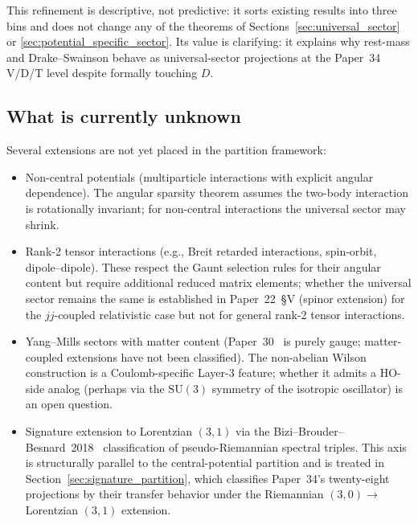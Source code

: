 \documentclass[twocolumn,pra,amsmath,amssymb,superscriptaddress]{revtex4-2}
\begin{document}
This refinement is descriptive, not predictive: it sorts existing
results into three bins and does not change any of the theorems of
Sections~\ref{sec:universal_sector} or
\ref{sec:potential_specific_sector}.  Its value is clarifying:
it explains why rest-mass and Drake--Swainson behave as
universal-sector projections at the Paper~34 V/D/T level despite
formally touching $D$.

\subsection{What is currently unknown}

Several extensions are not yet placed in the partition framework:

\begin{itemize}
\item Non-central potentials (multiparticle interactions with
  explicit angular dependence).  The angular sparsity theorem
  assumes the two-body interaction is rotationally invariant; for
  non-central interactions the universal sector may shrink.
\item Rank-2 tensor interactions (e.g., Breit retarded interactions,
  spin-orbit, dipole--dipole).  These respect the Gaunt selection
  rules for their angular content but require additional reduced
  matrix elements; whether the universal sector remains the same
  is established in Paper~22~\S V (spinor extension) for the
  $jj$-coupled relativistic case but not for general rank-2 tensor
  interactions.
\item Yang--Mills sectors with matter content (Paper~30~\cite{paper30}
  is purely gauge; matter-coupled extensions have not been
  classified).  The non-abelian Wilson construction is a
  Coulomb-specific Layer-3 feature; whether it admits a HO-side
  analog (perhaps via the $\mathrm{SU}(3)$ symmetry of the
  isotropic oscillator) is an open question.
\item Signature extension to Lorentzian $(3, 1)$ via the
  Bizi--Brouder--Besnard~2018~\cite{bizi_brouder_besnard2018}
  classification of pseudo-Riemannian spectral triples.  This
  axis is structurally parallel to the central-potential
  partition and is treated in
  Section~\ref{sec:signature_partition}, which classifies
  Paper~34's twenty-eight projections by their transfer behavior
  under the Riemannian $(3, 0) \to$ Lorentzian $(3, 1)$ extension.
\end{itemize}

\end{document}
